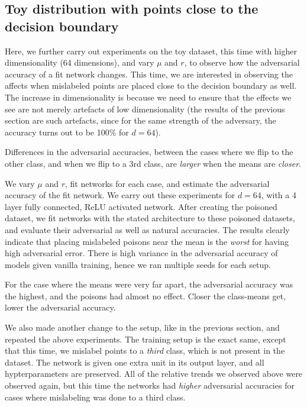 \documentclass{ociamthesis}
\begin{document}
\subsection{Toy distribution with points close to the decision boundary}

Here, we further carry out experiments on the toy dataset, this time with higher
dimensionality (64 dimensions), and vary $\mu$ and $r$, to observe how the
adversarial accuracy of a fit network changes. This time, we are interested in
observing the affects when mislabeled points are placed close to the decision
boundary as well. The increase in dimensionality is because we need to ensure
that the effects we see are not merely artefacts of low dimensionality (the
results of the previous section are such artefacts, since for the same strength
of the adversary, the accuracy turns out to be 100\% for $d=64$).

Differences in the adversarial accuracies, between the cases where we flip to
the other class, and when we flip to a 3rd class, are \emph{larger} when the
means are \emph{closer}.

We vary $\mu$ and $r$, fit networks for each case, and estimate the adversarial
accuracy of the fit network. We carry out these experiments for $d=64$, with a 4
layer fully connected, ReLU activated network. After creating the poisoned
dataset, we fit networks with the stated architecture to these poisoned
datasets, and evaluate their adversarial as well as natural accuracies. The
results clearly indicate that placing mislabeled poisons near the mean is the
\emph{worst} for having high adversarial error. There is high variance in the
adversarial accuracy of models given vanilla training, hence we ran multiple
seeds for each setup.

For the case where the means were very far apart, the adversarial accuracy was
the highest, and the poisons had almost no effect. Closer the class-means get,
lower the adversarial accuracy.

We also made another change to the setup, like in the previous section, and
repeated the above experiments. The training setup is the exact same, except
that this time, we mislabel points to a \emph{third} class, which is not present
in the dataset. The network is given one extra unit in its output layer, and all
hypterparameters are preserved. All of the relative trends we observed above
were observed again, but this time the networks had \emph{higher} adversarial
accuracies for cases where mislabeling was done to a third class.
\end{document}
